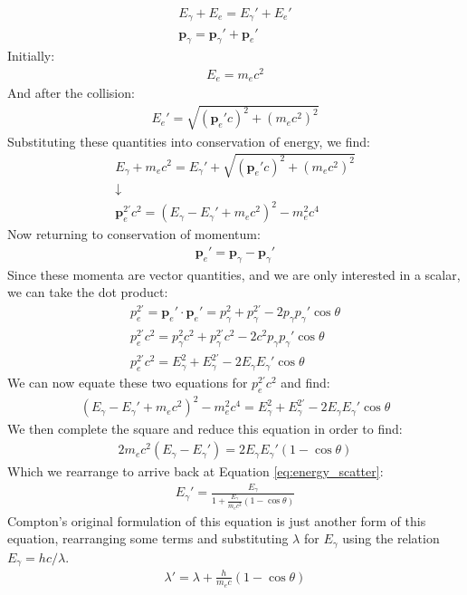 \documentclass[%
 reprint,
 amsmath,amssymb,
 aps,
 pra,
]{revtex4-1}
\begin{document}
\begin{appendix}
\begin{gather}
	E_\gamma + E_e = E_\gamma ' + E_e '\nonumber \\
	\mathbf{p}_\gamma = \mathbf{p}_\gamma' + \mathbf{p}_e' \nonumber
\end{gather}
Initially:
\begin{gather}
	E_e = m_e c^2 \nonumber
\end{gather}
And after the collision:
\begin{gather}
	E_e' = \sqrt{(\mathbf{p}_e' c)^2 + (m_e c^2)^2} \nonumber
\end{gather}
Substituting these quantities into conservation of energy, we find:
\begin{gather}
	E_\gamma + m_e c^2 = E_\gamma' + \sqrt{(\mathbf{p}_e' c)^2 + (m_e c^2)^2} \nonumber \\
	\downarrow \nonumber \\
	\mathbf{p}_e^{2'} c^2  = (E_\gamma - E_\gamma' + m_e c^2)^2 - m_e^2 c^4 \nonumber
\end{gather}
Now returning to conservation of momentum:
\begin{gather}
	\mathbf{p}_e' = \mathbf{p}_\gamma - \mathbf{p}_\gamma' \nonumber
\end{gather}
Since these momenta are vector quantities, and we are only interested in a scalar, we can take the dot product:
\begin{gather}
	p_e^{2'} = \mathbf{p}_e' \cdot \mathbf{p}_e' = p_\gamma^2 + p_\gamma^{2'} - 2 p_\gamma p_\gamma' \cos{\theta} \nonumber \\
	p_e^{2'} c^2 =  p_\gamma^2 c^2 + p_\gamma^{2'} c^2 - 2 c^2 p_\gamma p_\gamma' \cos{\theta} \nonumber \\
	p_e^{2'} c^2 = E_\gamma^2 + E_\gamma^{2'} - 2 E_\gamma E_\gamma' \cos{\theta} \nonumber
\end{gather}
We can now equate these two equations for $p_e^{2'} c^2$ and find:
\begin{gather}
	(E_\gamma - E_\gamma' + m_e c^2)^2 - m_e^2 c^4 = E_\gamma^2 + E_\gamma^{2'} - 2 E_\gamma E_\gamma' \cos{\theta} \nonumber
\end{gather}
We then complete the square and reduce this equation in order to find:
\begin{gather}
	2 m_e c^2 (E_\gamma - E_\gamma') = 2 E_\gamma E_\gamma' (1- \cos{\theta}) \nonumber
\end{gather}
Which we rearrange to arrive back at Equation \ref{eq:energy_scatter}:
\begin{gather}
	E_\gamma ' = \frac{E_\gamma}{1 + \frac{E_\gamma}{m_e c^2} (1 - \cos{\theta})} \nonumber
\end{gather}
Compton's original formulation of this equation is just another form of this equation, rearranging some terms and substituting $\lambda$ for $E_\gamma$ using the relation $E_\gamma = hc/\lambda$.
\begin{gather}
	\lambda' = \lambda + \frac{h}{m_e c} (1 - \cos{\theta}) \nonumber
\end{gather}


\end{appendix}
\end{document}

